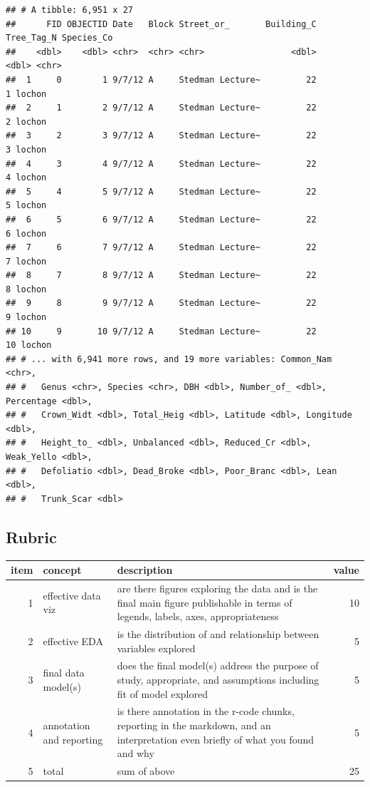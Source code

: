 \documentclass[
]{book}
\begin{document}
\begin{verbatim}
## # A tibble: 6,951 x 27
##      FID OBJECTID Date   Block Street_or_       Building_C Tree_Tag_N Species_Co
##    <dbl>    <dbl> <chr>  <chr> <chr>                 <dbl>      <dbl> <chr>     
##  1     0        1 9/7/12 A     Stedman Lecture~         22          1 lochon    
##  2     1        2 9/7/12 A     Stedman Lecture~         22          2 lochon    
##  3     2        3 9/7/12 A     Stedman Lecture~         22          3 lochon    
##  4     3        4 9/7/12 A     Stedman Lecture~         22          4 lochon    
##  5     4        5 9/7/12 A     Stedman Lecture~         22          5 lochon    
##  6     5        6 9/7/12 A     Stedman Lecture~         22          6 lochon    
##  7     6        7 9/7/12 A     Stedman Lecture~         22          7 lochon    
##  8     7        8 9/7/12 A     Stedman Lecture~         22          8 lochon    
##  9     8        9 9/7/12 A     Stedman Lecture~         22          9 lochon    
## 10     9       10 9/7/12 A     Stedman Lecture~         22         10 lochon    
## # ... with 6,941 more rows, and 19 more variables: Common_Nam <chr>,
## #   Genus <chr>, Species <chr>, DBH <dbl>, Number_of_ <dbl>, Percentage <dbl>,
## #   Crown_Widt <dbl>, Total_Heig <dbl>, Latitude <dbl>, Longitude <dbl>,
## #   Height_to_ <dbl>, Unbalanced <dbl>, Reduced_Cr <dbl>, Weak_Yello <dbl>,
## #   Defoliatio <dbl>, Dead_Broke <dbl>, Poor_Branc <dbl>, Lean <dbl>,
## #   Trunk_Scar <dbl>
\end{verbatim}

\hypertarget{rubric-1}{%
\subsection*{Rubric}\label{rubric-1}}

\begin{tabular}{rllr}
\toprule
item & concept & description & value\\
\midrule
1 & effective data viz & are there figures exploring the data and is the final main figure publishable in terms of legends, labels, axes, appropriateness & 10\\
2 & effective EDA & is the distribution of and relationship between variables explored & 5\\
3 & final data model(s) & does the final model(s) address the purpose of study, appropriate, and assumptions including  fit of model explored & 5\\
4 & annotation and reporting & is there annotation in the r-code chunks, reporting in the markdown, and an interpretation even briefly of what you found and why & 5\\
5 & total & sum of above & 25\\
\bottomrule
\end{tabular}

  
\end{document}
